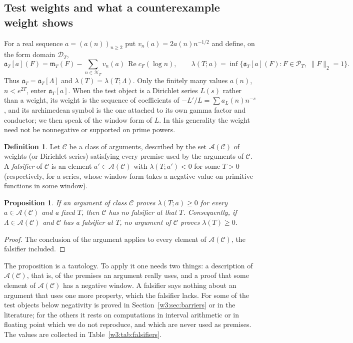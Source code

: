 \documentclass[11pt]{amsart}
\newtheorem{proposition}[theorem]{Proposition}
\theoremstyle{definition}
\newtheorem{definition}[theorem]{Definition}
\theoremstyle{remark}
\numberwithin{equation}{section}
\DeclareMathOperator{\Rel}{Re}
\newcommand{\cF}{c_F}                                  %
\newcommand{\PT}{\mathcal{P}_T}                        %
\newcommand{\DT}{\mathcal{D}_T}                        %
\newcommand{\NT}{\mathcal{N}_T}                        %
\newcommand{\mT}{\mathfrak{m}_T}                       %
\newcommand{\aT}{\mathfrak{a}_T}                       %
\newcommand{\lam}{\lambda(T)}                          %
\begin{document}
\subsection{Test weights and what a counterexample weight shows}
\label{w3:subsec:logic}\label{w3:subsec:models}\label{w3:subsec:table}\label{w3:subsec:use}

For a real sequence $a=(a(n))_{n\ge2}$ put $v_n(a)=2a(n)n^{-1/2}$ and define, on the form domain $\DT$,
\begin{equation}\label{w3:eq:aTa}
  \aT[a](F)=\mT(F)-\sum_{n\in\NT}v_n(a)\,\Rel\cF(\log n),
  \qquad
  \lambda(T;a)=\inf\{\aT[a](F):F\in\PT,\ \|F\|_2=1\}.
\end{equation}
Thus $\aT=\aT[\Lambda]$ and $\lam=\lambda(T;\Lambda)$. Only the finitely many values $a(n)$, $n<e^{2T}$, enter
$\aT[a]$. When the test object is a Dirichlet series $L(s)$ rather than a weight, its weight is the sequence of
coefficients of $-L'/L=\sum a_L(n)n^{-s}$, and its archimedean symbol is the one attached to its own gamma
factor and conductor; we then speak of the window form of $L$. In this generality the weight need not be
nonnegative or supported on prime powers.

\begin{definition}\label{w3:def:falsifier}
Let $\mathcal C$ be a class of arguments, described by the set $\mathcal A(\mathcal C)$ of weights (or
Dirichlet series) satisfying every premise used by the arguments of $\mathcal C$. A \emph{falsifier} of
$\mathcal C$ is an element $a'\in\mathcal A(\mathcal C)$ with $\lambda(T;a')<0$ for some $T>0$ (respectively,
for a series, whose window form takes a negative value on primitive functions in some window).
\end{definition}

\begin{proposition}\label{w3:prop:principle}
If an argument of class $\mathcal C$ proves $\lambda(T;a)\ge0$ for every $a\in\mathcal A(\mathcal C)$ and a
fixed $T$, then $\mathcal C$ has no falsifier at that $T$. Consequently, if $\Lambda\in\mathcal A(\mathcal C)$
and $\mathcal C$ has a falsifier at $T$, no argument of $\mathcal C$ proves $\lam\ge0$.
\end{proposition}

\begin{proof}
The conclusion of the argument applies to every element of $\mathcal A(\mathcal C)$, the falsifier included.
\end{proof}

The proposition is a tautology. To apply it one needs two things: a description of $\mathcal A(\mathcal C)$, that is,
of the premises an argument really uses, and a proof that some element of $\mathcal A(\mathcal C)$ has a negative
window. A falsifier says nothing about an argument that uses one more property, which the falsifier lacks. For some
of the test objects below negativity is proved in Section~\ref{w3:sec:barriers} or in the literature; for the others
it rests on computations in interval arithmetic or in floating point which we do not reproduce, and which are never
used as premises. The values are collected in Table~\ref{w3:tab:falsifiers}.
\end{document}
